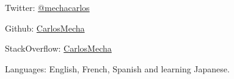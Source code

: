 
\begin{rlist}
  \item Twitter: \href{https://twitter.com/mechacarlos}{@mechacarlos}
  \item Github: \href{https://github.com/CarlosMecha}{CarlosMecha}
  \item StackOverflow: \href{http://stackoverflow.com/users/1849720/carlosmecha}{CarlosMecha}
  \item Languages: English, French, Spanish and learning Japanese.
\end{rlist}

